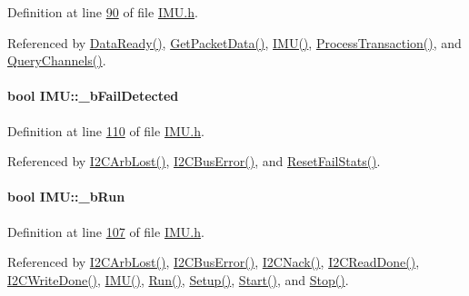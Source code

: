 Definition at line \hyperlink{_i_m_u_8h_source_l00090}{90} of file \hyperlink{_i_m_u_8h_source}{IMU.h}.



Referenced by \hyperlink{_i_m_u_8cpp_source_l00564}{DataReady()}, \hyperlink{_i_m_u_8cpp_source_l00603}{GetPacketData()}, \hyperlink{_i_m_u_8cpp_source_l00020}{IMU()}, \hyperlink{_i_m_u_8cpp_source_l00348}{ProcessTransaction()}, and \hyperlink{_i_m_u_8cpp_source_l00120}{QueryChannels()}.

\hypertarget{class_i_m_u_a12238a84e20f54c5fe799e0b37feb0ea}{
\paragraph[{\_\-bFailDetected}]{\setlength{\rightskip}{0pt plus 5cm}bool {\bf IMU::\_\-bFailDetected}}\hfill}
\label{class_i_m_u_a12238a84e20f54c5fe799e0b37feb0ea}


Definition at line \hyperlink{_i_m_u_8h_source_l00110}{110} of file \hyperlink{_i_m_u_8h_source}{IMU.h}.



Referenced by \hyperlink{_i_m_u_8cpp_source_l00534}{I2CArbLost()}, \hyperlink{_i_m_u_8cpp_source_l00499}{I2CBusError()}, and \hyperlink{_i_m_u_8h_source_l00200}{ResetFailStats()}.

\hypertarget{class_i_m_u_a547fe1fb8adb34917aa08663919b97df}{
\paragraph[{\_\-bRun}]{\setlength{\rightskip}{0pt plus 5cm}bool {\bf IMU::\_\-bRun}}\hfill}
\label{class_i_m_u_a547fe1fb8adb34917aa08663919b97df}


Definition at line \hyperlink{_i_m_u_8h_source_l00107}{107} of file \hyperlink{_i_m_u_8h_source}{IMU.h}.



Referenced by \hyperlink{_i_m_u_8cpp_source_l00534}{I2CArbLost()}, \hyperlink{_i_m_u_8cpp_source_l00499}{I2CBusError()}, \hyperlink{_i_m_u_8cpp_source_l00463}{I2CNack()}, \hyperlink{_i_m_u_8cpp_source_l00446}{I2CReadDone()}, \hyperlink{_i_m_u_8cpp_source_l00432}{I2CWriteDone()}, \hyperlink{_i_m_u_8cpp_source_l00020}{IMU()}, \hyperlink{_i_m_u_8cpp_source_l00290}{Run()}, \hyperlink{_i_m_u_8cpp_source_l00194}{Setup()}, \hyperlink{_i_m_u_8cpp_source_l00239}{Start()}, and \hyperlink{_i_m_u_8cpp_source_l00268}{Stop()}.

